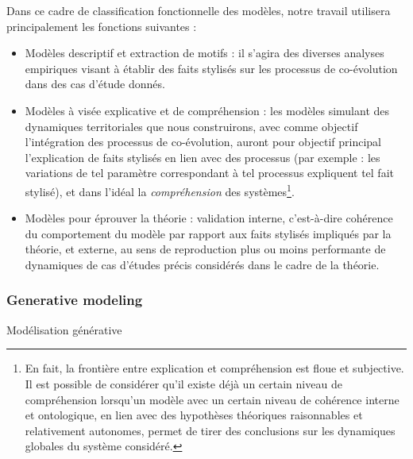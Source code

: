 Dans ce cadre de classification fonctionnelle des modèles, notre travail utilisera principalement les fonctions suivantes :

\begin{itemize}
	\item Modèles descriptif et extraction de motifs : il s'agira des diverses analyses empiriques visant à établir des faits stylisés sur les processus de co-évolution dans des cas d'étude donnés.
	\item Modèles à visée explicative et de compréhension : les modèles simulant des dynamiques territoriales que nous construirons, avec comme objectif l'intégration des processus de co-évolution, auront pour objectif principal l'explication de faits stylisés en lien avec des processus (par exemple : les variations de tel paramètre correspondant à tel processus expliquent tel fait stylisé), et dans l'idéal la \emph{compréhension} des systèmes\footnote{En fait, la frontière entre explication et compréhension est floue et subjective. Il est possible de considérer qu'il existe déjà un certain niveau de compréhension lorsqu'un modèle avec un certain niveau de cohérence interne et ontologique, en lien avec des hypothèses théoriques raisonnables et relativement autonomes, permet de tirer des conclusions sur les dynamiques globales du système considéré.}.
	\item Modèles pour éprouver la théorie : validation interne, c'est-à-dire cohérence du comportement du modèle par rapport aux faits stylisés impliqués par la théorie, et externe, au sens de reproduction plus ou moins performante de dynamiques de cas d'études précis considérés dans le cadre de la théorie.  
\end{itemize}

\subsubsection{Generative modeling}{Modélisation générative}


